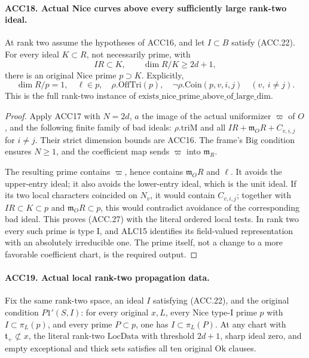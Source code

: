 \documentclass[11pt,a4paper]{article}
\numberwithin{equation}{section}
\theoremstyle{remark}\newtheorem{remark}[theorem]{Remark}
\begin{document}
\paragraph{ACC18. Actual Nice curves above every sufficiently large rank-two ideal.}
\label{claim:ACC18}
At rank two assume the hypotheses of ACC16, and let \(I\subset B\)
satisfy (ACC.22).  For every ideal \(K\subset R\), not necessarily
prime, with
\[
                       IR\subset K,\qquad \dim R/K\ge2d+1,
\]
there is an original Nice prime \(p\supset K\).  Explicitly,
\[
 \dim R/p=1,\quad \ell\in p,\quad
 \rho.\mathrm{OffTri}(p),\quad
 \neg\rho.\mathrm{Coin}(p,v,i,j)\quad(v,\ i\ne j).
                                                               \tag{ACC.27}
\]
This is the full rank-two instance of
\(\mathrm{exists\_\allowbreak nice\_\allowbreak prime\_\allowbreak above\_\allowbreak of\_\allowbreak large\_\allowbreak dim}\).

\begin{proof}
Apply ACC17 with \(N=2d\), \(a\) the image of the actual
uniformizer \(\varpi\) of \(O\), and the following finite
family of bad ideals: \(\rho.\mathrm{triM}\) and all
\(IR+\mathfrak m_O R+C_{v,i,j}\) for \(i\ne j\).
Their strict dimension bounds are ACC16.  The frame's \(\mathrm{Big}\)
condition ensures \(N\ge1\), and the coefficient map sends
\(\varpi\) into \(\mathfrak m_R\).

The resulting prime contains \(\varpi\), hence contains
\(\mathfrak m_O R\) and \(\ell\).  It avoids the upper-entry
ideal; it also avoids the lower-entry ideal, which is the unit
ideal.  If its two local characters coincided on \(N_v\), it
would contain \(C_{v,i,j}\); together with \(IR\subset K\subset p\)
and \(\mathfrak m_OR\subset p\), this would contradict avoidance
of the corresponding bad ideal.  This proves (ACC.27) with the
literal ordered local tests.  In rank two every such prime is
type I, and ALC15 identifies its field-valued representation with
an absolutely irreducible one.  The prime itself, not a change to
a more favorable coefficient chart, is the required output.
\end{proof}

\paragraph{ACC19. Actual local rank-two propagation data.}
\label{claim:ACC19}
Fix the same rank-two space, an ideal \(I\) satisfying (ACC.22),
and the original condition \(P1'(S,I)\): for every original
\(x,L\), every Nice type-I prime \(p\) with
\(I\subset\pi_L(p)\), and every prime \(P\subset p\),
one has \(I\subset\pi_L(P)\).  At any chart with
\(\mathfrak t_+\not\subset x\), the literal rank-two
\(\mathrm{LocData}\) with threshold \(2d+1\), sharp ideal
zero, and empty exceptional and thick sets satisfies all ten
original \(\mathrm{Ok}\) clauses.
\end{document}
